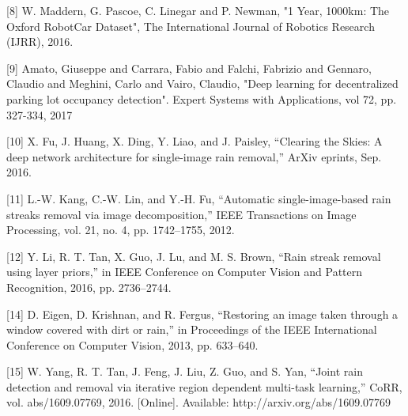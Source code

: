 \documentclass{article}
\begin{document}
\label{[8]}[8] W. Maddern, G. Pascoe, C. Linegar and P. Newman, "1 Year, 1000km: The Oxford RobotCar Dataset", The International Journal of Robotics Research (IJRR), 2016.

\label{[9]}[9] Amato, Giuseppe and Carrara, Fabio and Falchi, Fabrizio and Gennaro, Claudio and Meghini, Carlo and Vairo, Claudio, "Deep learning for decentralized parking lot occupancy detection". Expert Systems with Applications, vol 72, pp. 327-334, 2017

\label{[10]}[10] X. Fu, J. Huang, X. Ding, Y. Liao, and J. Paisley, “Clearing the Skies: A deep network architecture for single-image rain removal,” ArXiv eprints, Sep. 2016.

\label{[11]}[11] L.-W. Kang, C.-W. Lin, and Y.-H. Fu, “Automatic single-image-based rain streaks removal via image decomposition,” IEEE Transactions on Image Processing, vol. 21, no. 4, pp. 1742–1755, 2012.

\label{[12]}[12] Y. Li, R. T. Tan, X. Guo, J. Lu, and M. S. Brown, “Rain streak removal using layer priors,” in IEEE Conference on Computer Vision and Pattern Recognition, 2016, pp. 2736–2744.

\label{[14]}[14] D. Eigen, D. Krishnan, and R. Fergus, “Restoring an image taken through a window covered with dirt or rain,” in Proceedings of the IEEE International Conference on Computer Vision, 2013, pp. 633–640.

\label{[15]}[15] W. Yang, R. T. Tan, J. Feng, J. Liu, Z. Guo, and S. Yan, “Joint rain detection and removal via iterative region dependent multi-task learning,” CoRR, vol. abs/1609.07769, 2016. [Online]. Available: http://arxiv.org/abs/1609.07769
\end{document}
